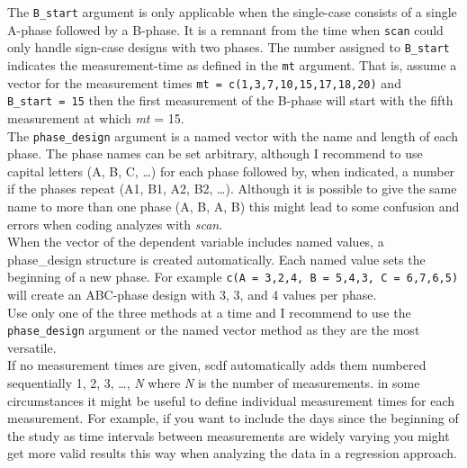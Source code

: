 \documentclass[
  letterpaper,
  DIV=11,
  numbers=noendperiod]{scrreprt}
\begin{document}
The \texttt{B\_start} argument is only applicable when the single-case
consists of a single A-phase followed by a B-phase. It is a remnant from
the time when \texttt{scan} could only handle sign-case designs with two
phases. The number assigned to \texttt{B\_start} indicates the
measurement-time as defined in the \texttt{mt} argument. That is, assume
a vector for the measurement times
\texttt{mt\ =\ c(1,3,7,10,15,17,18,20)} and \texttt{B\_start\ =\ 15}
then the first measurement of the B-phase will start with the fifth
measurement at which \emph{mt} = 15.\\
The \texttt{phase\_design} argument is a named vector with the name and
length of each phase. The phase names can be set arbitrary, although I
recommend to use capital letters (A, B, C, \ldots) for each phase
followed by, when indicated, a number if the phases repeat (A1, B1, A2,
B2, \ldots). Although it is possible to give the same name to more than
one phase (A, B, A, B) this might lead to some confusion and errors when
coding analyzes with \emph{scan}.\\
When the vector of the dependent variable includes named values, a
phase\_design structure is created automatically. Each named value sets
the beginning of a new phase. For example
\texttt{c(A\ =\ 3,2,4,\ B\ =\ 5,4,3,\ C\ =\ 6,7,6,5)} will create an
ABC-phase design with 3, 3, and 4 values per phase.\\
Use only one of the three methods at a time and I recommend to use the
\texttt{phase\_design} argument or the named vector method as they are
the most versatile.\\
If no measurement times are given, scdf automatically adds them numbered
sequentially 1, 2, 3, \ldots, \emph{N} where \emph{N} is the number of
measurements. in some circumstances it might be useful to define
individual measurement times for each measurement. For example, if you
want to include the days since the beginning of the study as time
intervals between measurements are widely varying you might get more
valid results this way when analyzing the data in a regression approach.
\end{document}
